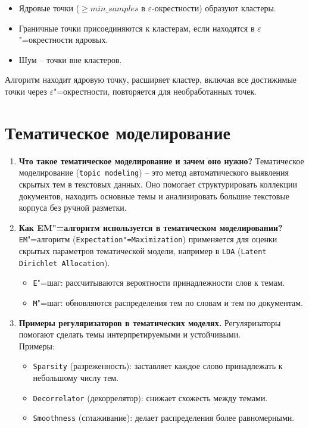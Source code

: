 \documentclass{article}
\begin{document}
\begin{enumerate}
        \begin{itemize}
            \item Ядровые точки ($\geq min\_samples$ в $\varepsilon$-окрестности) образуют кластеры.
            \item Граничные точки присоединяются к кластерам, если находятся в $\varepsilon$"=окрестности ядровых.
            \item Шум -- точки вне кластеров.
        \end{itemize}
        Алгоритм находит ядровую точку, расширяет кластер, включая все достижимые точки через $\varepsilon$"=окрестности, повторяется для необработанных точек.
\end{enumerate}

\section{Тематическое моделирование}
\begin{enumerate}
    \item \textbf{Что такое тематическое моделирование и зачем оно нужно?} Тематическое моделирование (\texttt{topic modeling}) -- это метод автоматического выявления скрытых тем в текстовых данных. Оно помогает структурировать коллекции документов, находить основные темы и анализировать большие текстовые корпуса без ручной разметки.
    \item \textbf{Как EM"=алгоритм используется в тематическом моделировании?} \texttt{EM}"=алгоритм (\texttt{Expectation"=Maximization}) применяется для оценки скрытых параметров тематической модели, например в \texttt{LDA} (\texttt{Latent Dirichlet Allocation}).
    \begin{itemize}
        \item \texttt{E}"=шаг: рассчитываются вероятности принадлежности слов к темам.
        \item \texttt{M}"=шаг: обновляются распределения тем по словам и тем по документам.
    \end{itemize}
    \item \textbf{Примеры регуляризаторов в тематических моделях.} Регуляризаторы помогают сделать темы интерпретируемыми и устойчивыми. \\
    Примеры:
    \begin{itemize}
        \item \texttt{Sparsity} (разреженность): заставляет каждое слово принадлежать к небольшому числу тем.
        \item \texttt{Decorrelator} (декоррелятор): снижает схожесть между темами.
        \item \texttt{Smoothness} (сглаживание): делает распределения более равномерными.
    \end{itemize}
\end{enumerate}
\end{document}
